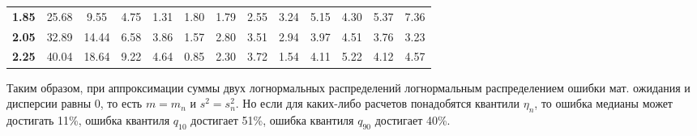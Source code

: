 \documentclass[12pt]{article}
\begin{document}
\begin{table}[]
\begin{tabular}{|c|ccclcccccccc}
		\textbf{1.85}                       & 25.68                              & 9.55                               & 4.75                               & 1.31                               & 1.80                               & 1.79                               & 2.55                               & 3.24                               & 5.15                               & 4.30                               & 5.37                               & 7.36                               \\ \cline{1-1}
		\textbf{2.05}                       & 32.89                              & 14.44                              & 6.58                               & 3.86                               & 1.57                               & 2.80                               & 3.51                               & 2.94                               & 3.97                               & 4.51                               & 3.76                               & 3.23                               \\ \cline{1-1}
		\multicolumn{1}{|l|}{\textbf{2.25}} & \multicolumn{1}{l}{40.04}          & \multicolumn{1}{l}{18.64}          & \multicolumn{1}{l}{9.22}           & 4.64                               & \multicolumn{1}{l}{0.85}           & \multicolumn{1}{l}{2.30}           & \multicolumn{1}{l}{3.72}           & \multicolumn{1}{l}{1.54}           & \multicolumn{1}{l}{4.11}           & \multicolumn{1}{l}{5.22}           & \multicolumn{1}{l}{4.12}           & \multicolumn{1}{l}{4.57}           \\ \cline{1-1}
	\end{tabular}
\end{table}

Таким образом, при аппроксимации суммы двух логнормальных распределений логнормальным распределением ошибки мат. ожидания и дисперсии равны 0, то есть $m=m_{n}$ и $s^{2} = s_{n}^{2}$. Но если для каких-либо расчетов понадобятся квантили $\eta_{n}$, то ошибка медианы может достигать 11\%, ошибка  квантиля $q_{10}$ достигает 51\%, ошибка квантиля $q_{90}$ достигает 40\%.
\end{document}
